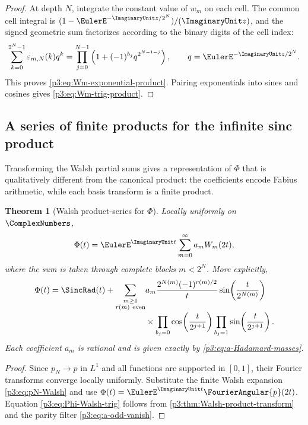 \documentclass[11pt]{article}
\newtheorem{theorem}{Theorem}[section]
\theoremstyle{definition}
\theoremstyle{remark}
\begin{document}
\begin{proof}
At depth $N$, integrate the constant value of $w_m$ on each cell.  The common
cell integral is $(1-\EulerE^{-\ImaginaryUnit z/2^N})/(\ImaginaryUnit z)$, and the signed geometric sum
factorizes according to the binary digits of the cell index:
\[
 \sum_{k=0}^{2^N-1}\varepsilon_{m,N}(k)q^k
 =\prod_{j=0}^{N-1}\left(1+(-1)^{b_j}q^{2^{N-1-j}}\right),
 \qquad q=\EulerE^{-\ImaginaryUnit z/2^N}.
\]
This proves \eqref{p3:eq:Wm-exponential-product}.  Pairing exponentials into sines
and cosines gives \eqref{p3:eq:Wm-trig-product}.
\end{proof}

\subsection{A series of finite products for the infinite sinc product}

Transforming the Walsh partial sums gives a representation of $\Phi$ that is
qualitatively different from the canonical product: the coefficients encode
Fabius arithmetic, while each basis transform is a finite product.

\begin{theorem}[Walsh product-series for $\Phi$]
\label{p3:thm:Phi-Walsh-product-series}
Locally uniformly on $\ComplexNumbers$,
\begin{equation}\label{p3:eq:Phi-Walsh-basic}
 \Phi(t)=\EulerE^{\ImaginaryUnit t}\sum_{m=0}^\infty a_mW_m(2t),
\end{equation}
where the sum is taken through complete blocks $m<2^N$.  More explicitly,
\begin{align}
 \Phi(t)=\SincRad(t)
 +\sum_{\substack{m\ge1\\r(m)\ \mathrm{even}}}
 &a_m\frac{2^{N(m)}(-1)^{r(m)/2}}{t}
 \sin\!\left(\frac{t}{2^{N(m)}}\right)
 \label{p3:eq:Phi-Walsh-trig}\\[-0.3em]
 &\times
 \prod_{b_j=0}\cos\!\left(\frac{t}{2^{j+1}}\right)
 \prod_{b_j=1}\sin\!\left(\frac{t}{2^{j+1}}\right).
 \nonumber
\end{align}
Each coefficient $a_m$ is rational and is given exactly by
\eqref{p3:eq:a-Hadamard-masses}.
\end{theorem}

\begin{proof}
Since $p_N\to p$ in $L^1$ and all functions are supported in $[0,1]$, their
Fourier transforms converge locally uniformly.  Substitute the finite Walsh
expansion \eqref{p3:eq:pN-Walsh} and use
$\Phi(t)=\EulerE^{\ImaginaryUnit t}\FourierAngular{p}(2t)$.  Equation
\eqref{p3:eq:Phi-Walsh-trig} follows from
\cref{p3:thm:Walsh-product-transform} and the parity filter
\eqref{p3:eq:a-odd-vanish}.
\end{proof}
\end{document}
